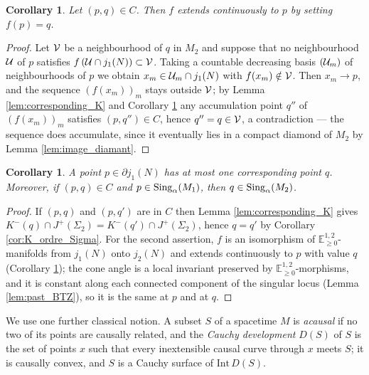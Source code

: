 \documentclass[a4paper,twoside]{article}
\newcommand{\mass}[1]{\mathbb{E}^{1,2}_{#1}}
\newtheorem{cor}[lem]{Corollary}
\begin{document}
\begin{cor}\label{cor:ext_continue}
Let $(p,q)\in C$. Then $f$ extends continuously to $p$ by setting $f(p)=q$.
\end{cor}
\begin{proof}
Let $\mathcal V$ be a neighbourhood of $q$ in $M_2$ and suppose that no neighbourhood $\mathcal{U}$ of $p$ satisfies
$f\left(\mathcal{U}\cap j_1(N)\right)\subset \mathcal V$. Taking a countable decreasing basis $(\mathcal{U}_m)$ of
neighbourhoods of $p$ we obtain $x_m\in \mathcal{U}_m\cap j_1(N)$ with $f(x_m)\notin \mathcal V$. Then $x_m
\rightarrow p$, and the sequence $\left(f(x_m)\right)_m$ stays outside $\mathcal V$; by Lemma
\ref{lem:corresponding_K} and Corollary \ref{cor:model_corresponding} any accumulation point $q''$
of $\left(f(x_m)\right)_m$ satisfies $(p,q'')\in C$, hence $q''=q\in \mathcal V$, a contradiction --- the
sequence does accumulate, since it eventually lies in a compact diamond of $M_2$ by Lemma
\ref{lem:image_diamant}.
\end{proof}
\begin{cor}\label{cor:model_corresponding}
A point $p\in \partial j_1(N)$ has at most one corresponding point $q$. Moreover, if $(p,q)\in C$
and $p\in \mathrm{Sing}_\alpha(M_1)$, then $q\in \mathrm{Sing}_\alpha(M_2)$.
\end{cor}
\begin{proof}
If $(p,q)$ and $(p,q')$ are in $C$ then Lemma \ref{lem:corresponding_K} gives $K^-(q)\cap
J^+(\Sigma_2)=K^-(q')\cap J^+(\Sigma_2)$, hence $q=q'$ by Corollary \ref{cor:K_ordre_Sigma}. For
the second assertion, $f$ is an isomorphism of $\mass{\geq0}$-manifolds from $j_1(N)$ onto $j_2(N)$
and extends continuously to $p$ with value $q$ (Corollary \ref{cor:ext_continue}); the cone angle is
a local invariant preserved by $\mass{\geq0}$-morphisms, and it is constant along each connected
component of the singular locus (Lemma \ref{lem:past_BTZ}), so it is the same at $p$ and at $q$.
\end{proof}


We use one further classical notion. A subset $S$ of a spacetime $M$ is \emph{acausal} if no two of
its points are causally related, and the \emph{Cauchy development} $D(S)$ of $S$ is the set of points
$x$ such that every inextensible causal curve through $x$ meets $S$; it is causally convex, and $S$
is a Cauchy surface of $\mathrm{Int}\,D(S)$.
\end{document}
